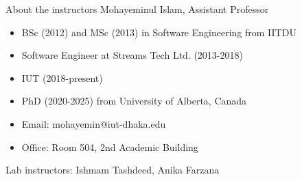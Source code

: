 \begin{frame}{About the instructors}
    Mohayeminul Islam, Assistant Professor
    \small
    \begin{itemize}
        \item BSc (2012) and MSc (2013) in Software Engineering from IITDU
        \item Software Engineer at Streams Tech Ltd. (2013-2018)
        \item IUT (2018-present)
        \item PhD (2020-2025) from University of Alberta, Canada        
        \item Email: mohayemin@iut-dhaka.edu
        \item Office: Room 504, 2nd Academic Building
    \end{itemize}

    Lab instructors: Ishmam Tashdeed, Anika Farzana
\end{frame}
